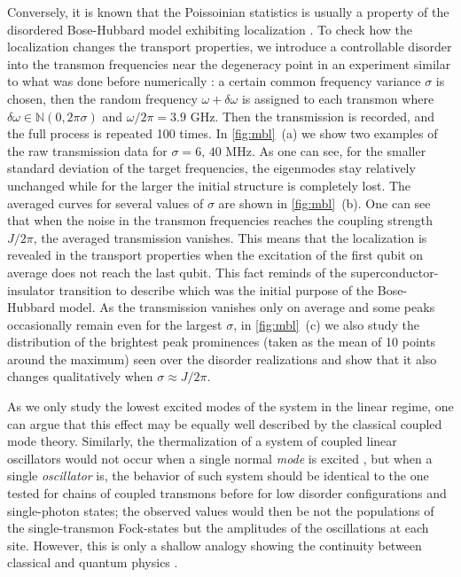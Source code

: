 \documentclass[%
 aps, prl,
 amsmath,amssymb,
 reprint,%
superscriptaddress
]{revtex4-2}
\begin{document}
Conversely, it is known that the Poissoinian statistics is usually a property of the disordered Bose-Hubbard model exhibiting localization \cite{roushan2017spectroscopic, Yan2019,Ye2019}. To check how the localization changes the transport properties, we introduce a controllable disorder into the transmon frequencies near the degeneracy point in an experiment similar to what was done before numerically \cite{orell2019probing}: a certain common frequency variance $\sigma$ is chosen, then the random frequency $\omega + \delta \omega$ is assigned to each transmon where $\delta\omega \in \mathbb N(0,2\pi\sigma)$ and $\omega/2\pi = 3.9$ GHz. Then the transmission is recorded, and the full process is repeated 100 times. 
In \autoref{fig:mbl}~(a) we show two examples of the raw transmission data for  $\sigma = 6,\, 40$ MHz. As one can see, for the smaller standard deviation of the target frequencies, the eigenmodes stay relatively unchanged while for the larger the initial structure is completely lost. The averaged curves for several values of $\sigma$ are shown in \autoref{fig:mbl}~(b). One can see that when the noise in the transmon frequencies reaches the coupling strength $J/2\pi$, the averaged transmission vanishes. This means that the localization is revealed in the transport properties when the excitation of the first qubit on average does not reach the last qubit. This fact reminds of the superconductor-insulator transition \cite{bruder1993superconductor} to describe which was the initial purpose of the Bose-Hubbard model. As the transmission vanishes only on average and some peaks occasionally remain even for the largest $\sigma$, in \autoref{fig:mbl}~(c) we also study the distribution of the brightest peak prominences (taken as the mean of 10 points around the maximum) seen over the disorder realizations and show that it also changes qualitatively when $\sigma \approx J/2\pi$.  

As we only study the lowest excited modes of the system in the linear regime, one can argue that this effect may be equally well described by the classical coupled mode theory. Similarly, the thermalization of a system of coupled linear oscillators would not occur when a single normal \textit{mode} is excited \cite{deutsch2018eigenstate}, but when a single \textit{oscillator} is, the behavior of such system should be identical to the one tested for chains of coupled transmons before \cite{Yan2019, ma2019dissipatively} for low disorder configurations and single-photon states; the observed values would then be not the populations of the single-transmon Fock-states but the amplitudes of the oscillations at each site. However, this is only a shallow analogy showing the continuity between classical and quantum physics \cite{park2012classical}.
\end{document}
